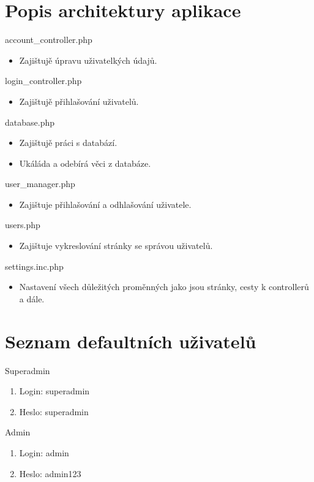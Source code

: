 \documentclass[12pt, a4paper]{report}
\begin{document}
\section{Popis architektury aplikace}
account\_controller.php
\begin{itemize}[left=1cm]
    \item Zajištujě úpravu uživatelkých údajů.
\end{itemize}

login\_controller.php
\begin{itemize}[left=1cm]
    \item Zajištujě přihlašování uživatelů.
\end{itemize} 

database.php
\begin{itemize}[left=1cm]
    \item Zajištujě práci s databází.
    \item Ukáláda a odebírá věci z databáze.
\end{itemize} 

user\_manager.php
\begin{itemize}[left=1cm]
    \item Zajištuje přihlašování a odhlašování uživatele.
\end{itemize}

users.php
\begin{itemize}[left=1cm]
    \item Zajištuje vykreslování stránky se správou uživatelů.
\end{itemize}

settings.inc.php
\begin{itemize}[left=1cm]
    \item Nastavení všech důležitých proměnných jako jsou stránky, cesty k controllerů a dále.
\end{itemize}


\section{Seznam defaultních uživatelů}

Superadmin
\begin{enumerate}[left=1cm]
    \item Login: superadmin
    \item Heslo: superadmin
\end{enumerate}

Admin
\begin{enumerate}[left=1cm]
    \item Login: admin
    \item Heslo: admin123
\end{enumerate}
\end{document}
